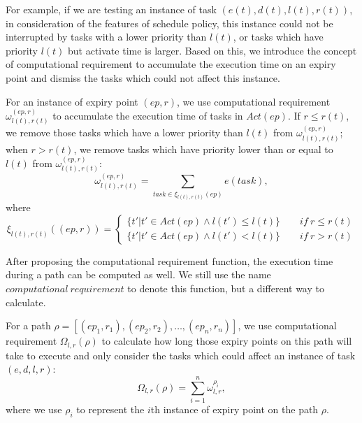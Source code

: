 \documentclass[sigconf]{acmart}
\begin{document}
For example, if we are testing an instance of task $(e(t),d(t),l(t),r(t))$, in consideration of the features of schedule policy, this instance could not be interrupted by tasks with a lower priority than $l(t)$, or tasks which have priority $l(t)$ but activate time is larger. Based on this, we introduce the concept of computational requirement to accumulate the execution time on an expiry point and dismiss the tasks which could not affect this instance.
\begin{definition}
For an instance of expiry point $(ep,r)$, we use computational requirement $\omega_{l(t),r(t)}^{(ep,r)}$ to accumulate the execution time of tasks in $Act(ep)$. If $r\leq r(t)$, we remove those tasks which have a lower priority than $l(t)$ from $\omega_{l(t),r(t)}^{(ep,r)}$; when $r>r(t)$, we remove tasks which have priority lower than or equal to $l(t)$ from $\omega_{l(t),r(t)}^{(ep,r)}$:
\begin{equation}
\omega_{l(t),r(t)}^{(ep,r)}=\sum\limits_{task\in \xi_{l(t),r(t)}(ep)}e(task),
\end{equation}\label{equation_loweromega}
where 
\[
\xi_{l(t),r(t)}((ep,r))=\begin{cases}\{t'|t'\in Act(ep)\wedge l(t')\leq l(t)\}\qquad if\ r\leq r(t)\\
\{t'|t'\in Act(ep)\wedge l(t')<l(t)\}\qquad if\ r>r(t)
\end{cases}\]
\end{definition}
After proposing the computational requirement function, the execution time during a path can be computed as well. We still use the name $computational\ requirement$ to denote this function, but a different way to calculate.
\begin{definition}
For a path $\rho=[(ep_1,r_1),(ep_2,r_2),\dots,(ep_n,r_n)]$, we use computational requirement $\Omega_{l,r}(\rho)$ to calculate how long those expiry points on this path will take to execute and only consider the tasks which could affect an instance of task $(e,d,l,r)$:
\begin{equation}
\Omega_{l,r}(\rho)=\sum_{i=1}^n\omega_{l,r}^{\rho_i},
\end{equation}\label{equation_higheromega}
where we use $\rho_i$ to represent the $i$th instance of expiry point on the path $\rho$.
\end{definition}
\end{document}
